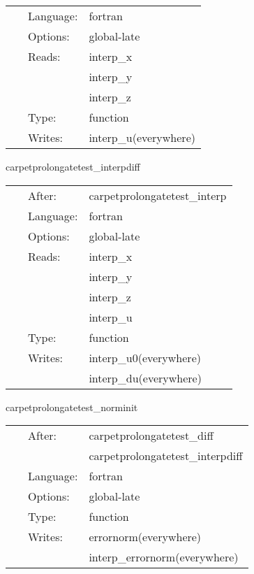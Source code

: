  \begin{tabular*}{160mm}{cll} 
~ & Language:  & fortran \\ 
~ & Options:  & global-late \\ 
~ & Reads:  & interp\_x \\ 
~& ~ &interp\_y\\ 
~& ~ &interp\_z\\ 
~ & Type:  & function \\ 
~ & Writes:  & interp\_u(everywhere) \\ 
\end{tabular*} 


\vspace{5mm}


\hspace{5mm} carpetprolongatetest\_interpdiff 

\hspace{5mm}{\it test interpolated data } 


\hspace{5mm}

 \begin{tabular*}{160mm}{cll} 
~ & After:  & carpetprolongatetest\_interp \\ 
~ & Language:  & fortran \\ 
~ & Options:  & global-late \\ 
~ & Reads:  & interp\_x \\ 
~& ~ &interp\_y\\ 
~& ~ &interp\_z\\ 
~& ~ &interp\_u\\ 
~ & Type:  & function \\ 
~ & Writes:  & interp\_u0(everywhere) \\ 
~& ~ &interp\_du(everywhere)\\ 
\end{tabular*} 


\vspace{5mm}


\hspace{5mm} carpetprolongatetest\_norminit 

\hspace{5mm}{\it calculate error norm } 


\hspace{5mm}

 \begin{tabular*}{160mm}{cll} 
~ & After:  & carpetprolongatetest\_diff \\ 
~& ~ &carpetprolongatetest\_interpdiff\\ 
~ & Language:  & fortran \\ 
~ & Options:  & global-late \\ 
~ & Type:  & function \\ 
~ & Writes:  & errornorm(everywhere) \\ 
~& ~ &interp\_errornorm(everywhere)\\ 
\end{tabular*} 


